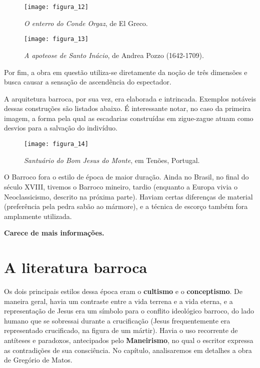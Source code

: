 \documentclass[12pt]{book}
\begin{document}
			\begin{figure}[h]
				\centering
				\texttt{[image: figura\_12]}
				\caption{\textit{O enterro do Conde Orgaz}, de El Greco.}
				\label{fig:mesh12}
			\end{figure}
			\begin{figure}[h]
				\centering
				\texttt{[image: figura\_13]}
				\caption{\textit{A apoteose de Santo Inácio}, de Andrea Pozzo (1642-1709).}
				\label{fig:mesh13}
			\end{figure}
			\par Por fim, a obra em questão utiliza-se diretamente da noção de três dimensões e busca causar a sensação de ascendência do espectador.
			\par A arquitetura barroca, por sua vez, era elaborada e intrincada. Exemplos notáveis dessas construções são listados abaixo. É interessante notar, no caso da primeira imagem, a forma pela qual as escadarias construídas em zigue-zague atuam como desvios para a salvação do indivíduo.
			\begin{figure}[h]
				\centering
				\texttt{[image: figura\_14]}
				\caption{\textit{Santuário do Bom Jesus do Monte}, em Tenões, Portugal.}
				\label{fig:mesh14}
			\end{figure}
			\par O Barroco fora o estilo de época de maior duração. Ainda no Brasil, no final do século XVIII, tivemos o Barroco mineiro, tardio (enquanto a Europa vivia o Neoclassicismo, descrito na próxima parte). Haviam certas diferenças de material (preferência pela pedra sabão ao mármore), e a técnica de escorço também fora amplamente utilizada.
			\par \textbf{Carece de mais informações.}
			
			\chapter{A literatura barroca}
			\par Os dois principais estilos dessa época eram o \textbf{cultismo} e o \textbf{conceptismo}. De maneira geral, havia um contraste entre a vida terrena e a vida eterna, e a representação de Jesus era um símbolo para o conflito ideológico barroco, do lado humano que se sobressai durante a crucificação (Jesus frequentemente era representado crucificado, na figura de um mártir). Havia o uso recorrente de antíteses e paradoxos, antecipados pelo \textbf{Maneirismo}, no qual o escritor expressa as contradições de sua consciência. No capítulo, analisaremos em detalhes a obra de Gregório de Matos.
			
\end{document}
